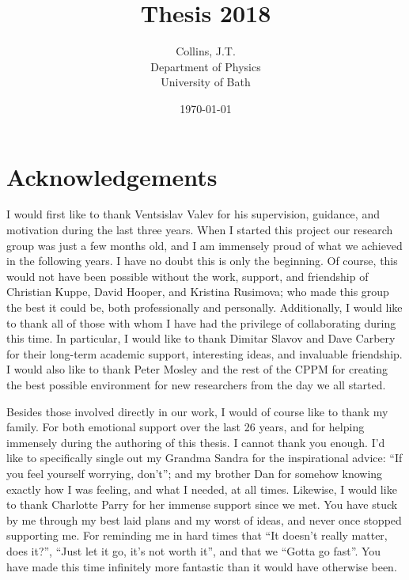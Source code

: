 \documentclass[11pt,a4paper,final]{report}
\title{Thesis 2018}
\author{
	Collins, J.T. \\ 
	Department of Physics\\
	University of Bath\\
}
\date{\today}
\begin{document}
\begin{titlepage}
    
\end{titlepage}

\begin{abstract}
	\setcounter{page}{0}  %
    
\end{abstract}
\clearpage

\clearpage 
\tableofcontents
\clearpage


\chapter*{Acknowledgements}
I would first like to thank Ventsislav Valev for his supervision, guidance, and motivation during the last three years. When I started this project our research group was just a few months old, and I am immensely proud of what we achieved in the following years. I have no doubt this is only the beginning. Of course, this would not have been possible without the work, support, and friendship of Christian Kuppe, David Hooper, and Kristina Rusimova; who made this group the best it could be, both professionally and personally. Additionally, I would like to thank all of those with whom I have had the privilege of collaborating during this time. In particular, I would like to thank Dimitar Slavov and Dave Carbery for their long-term academic support, interesting ideas, and invaluable friendship. I would also like to thank Peter Mosley and the rest of the CPPM for creating the best possible environment for new researchers from the day we all started. 

Besides those involved directly in our work, I would of course like to thank my family. For both emotional support over the last 26 years, and for helping immensely during the authoring of this thesis. I cannot thank you enough. I'd like to specifically single out my Grandma Sandra for the inspirational advice: ``If you feel yourself worrying, don't''; and my brother Dan for somehow knowing exactly how I was feeling, and what I needed, at all times. Likewise, I would like to thank Charlotte Parry for her immense support since we met. You have stuck by me through my best laid plans and my worst of ideas, and never once stopped supporting me. For reminding me in hard times that ``It doesn't really matter, does it?'', ``Just let it go, it's not worth it'', and that we ``Gotta go fast''. You have made this time infinitely more fantastic than it would have otherwise been.
\end{document}

